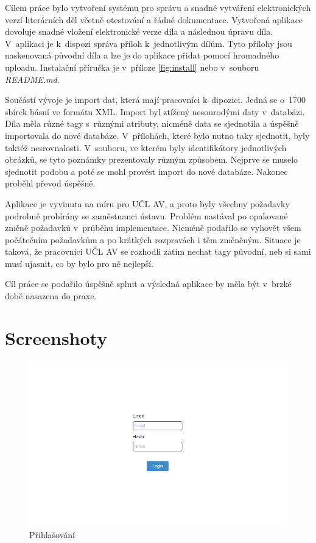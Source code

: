 \documentclass[thesis=B,czech]{FITthesis}[2012/06/26]
\begin{document}
\begin{conclusion}
    
	Cílem práce bylo vytvoření systému pro správu a snadné vytváření elektronických verzí literárních děl včetně otestování a řádné dokumentace. Vytvořená aplikace dovoluje snadné vložení elektronické verze díla a následnou úpravu díla. V~aplikaci je k~dispozi správa příloh k~jednotlivým dílům. Tyto přílohy jsou naskenovaná původní díla a lze je do aplikace přidat pomocí hromadného uploadu. Instalační příručka je v~příloze \ref{fig:install} nebo v~souboru \textit{README.md}.
	
	Součástí vývoje je import dat, která mají pracovníci k~dipozici. Jedná se o~1700 sbírek básní ve formátu XML. Import byl ztížený nesourodými daty v~databázi. Díla měla různé tagy s~různými atributy, nicméně data se sjednotila a úspěšně importovala do nové databáze. V~přílohách, které bylo nutno taky sjednotit, byly taktéž nesrovnalosti. V~souboru, ve kterém byly identifikátory jednotlivých obrázků, se tyto poznámky prezentovaly různým způsobem. Nejprve se muselo sjednotit podobu a poté se mohl provést import do nové databáze. Nakonec proběhl převod úspěšně.
	
	Aplikace je vyvinuta na míru pro UČL AV, a proto byly všechny požadavky podrobně probírány se zaměstnanci ústavu. Problém nastával po opakované změně požadavků v~průběhu implementace. Nicméně podařilo se vyhovět všem počátečním požadavkům a po krátkých rozpravách i těm změněným. Situace je taková, že pracovníci UČL AV se rozhodli zatím nechat tagy původní, neb si sami musí ujasnit, co by bylo pro ně nejlepší.
	
	Cíl práce se podařilo úspěšně splnit a výsledná aplikace by měla být v~brzké době nasazena do praxe.

\end{conclusion}




\appendix

\chapter{Screenshoty}

    \begin {figure}[H]\centering
        \includegraphics[width=\textwidth]{images/login}
        \caption {Přihlašování}
        \label {fig:login}
    \end{figure}
\end{document}
